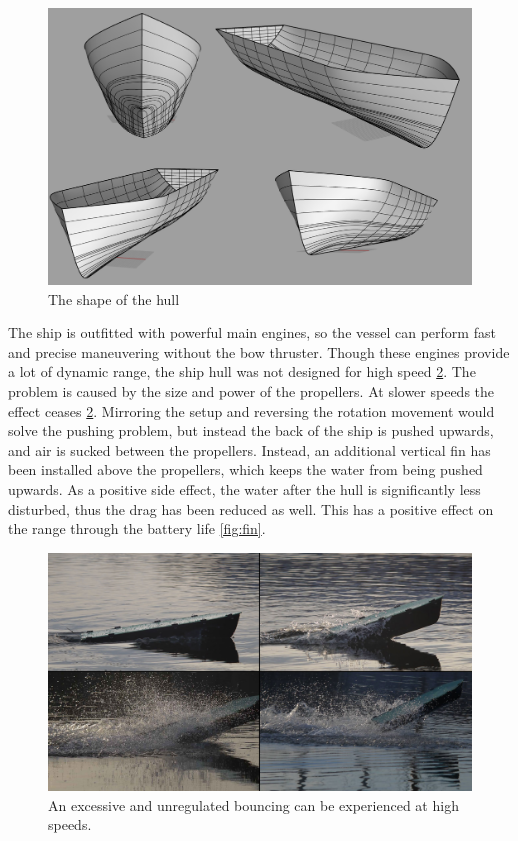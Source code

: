 \begin{figure}[htbp]
	\centering
	\includegraphics[width=\textwidth]{img/render/rendermontage.png}
	\caption{The shape of the hull}
	\label{fig:hullshape}
\end{figure}

The ship is outfitted with powerful main engines, so the vessel can perform fast and precise maneuvering without the bow thruster. Though these engines provide a lot of dynamic range, the ship hull was not designed for high speed \ref{fig:jumping}. The problem is caused by the size and power of the propellers. At slower speeds the effect ceases \ref{fig:jumping}.
Mirroring the setup and reversing the rotation movement would solve the pushing problem, but instead the back of the ship is pushed upwards, and air is sucked between the propellers. Instead, an additional vertical fin has been installed above the propellers, which keeps the water from being pushed upwards. As a positive side effect, the water after the hull is significantly less disturbed, thus the drag has been reduced as well. This has a positive effect on the range through the battery life \ref{fig:fin}.

\begin{figure}[htbp]
	\centering
	\includegraphics[width=\textwidth]{Pictures/VerticalJumpingTele.jpg}
	\caption{An excessive and unregulated bouncing can be experienced at high speeds.}
	\label{fig:jumping}
\end{figure}

